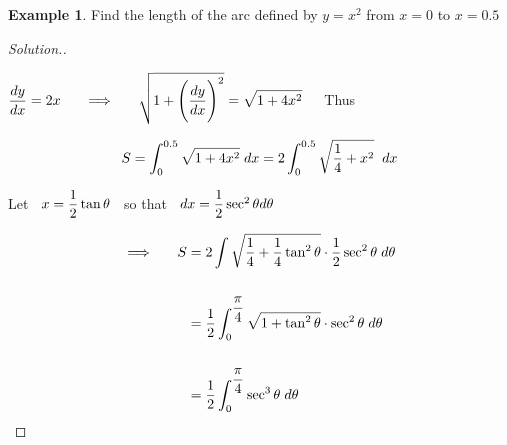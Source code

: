\documentclass[11pt,a4paper]{article}
\theoremstyle{definition}
\newtheorem{exa}[thm]{Example}
\newenvironment{solution}
  {\renewcommand{\qedsymbol}{}\begin{proof}[\textit{Solution}.]}
  {\end{proof}}
\begin{document}
\begin{exa}


Find the length of the arc defined by $y = x^2$ from $x = 0$ to $x = 0.5$


\pagebreak
\end{exa}
\begin{solution}



\begin{figure}[H]
\end{figure}

$\displaystyle{\dfrac{dy}{dx} = 2x \hspace{0.5cm} \implies \hspace{0.5cm} \sqrt{1 + \Bigg(\dfrac{dy}{dx}\Bigg)^2 } = \sqrt{1 + 4x^2}}\hspace{0.4cm}$ Thus


$$S =  \int^{0.5}_0 \sqrt{1 + 4x^2}\hspace{0.1cm} dx = 2\int^{0.5}_0 \sqrt{\dfrac{1}{4} + x^2}\hspace{0.2cm} dx$$

Let $\hspace{0.2cm} x = \dfrac{1}{2}\tan \theta\hspace{0.2cm}$ so that $\hspace{0.2cm} dx = \dfrac{1}{2}\sec^2\theta d \theta$

\begin{align*}
\implies\hspace{0.5cm} S & = 2\int \sqrt{\dfrac{1}{4} + \dfrac{1}{4}\tan^2\theta}\cdot \dfrac{1}{2}\sec^2\theta \hspace{0.1cm}d\theta\\\\
& = \dfrac{1}{2}\int_0^{\dfrac{\pi}{4}}\sqrt{1 + \tan^2\theta}\cdot \sec^2\theta\hspace{0.1cm}d\theta\\\\
& = \dfrac{1}{2}\int_0^{\dfrac{\pi}{4}} \sec^3\theta \hspace{0.1cm}d\theta\\
\end{align*}


\end{solution}
\end{document}
